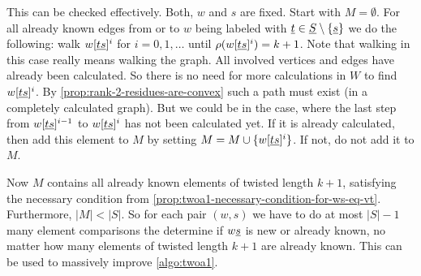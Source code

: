 This can be checked effectively. Both, $w$ and $s$ are fixed. Start with $M = \emptyset$. For all already known edges from or to $w$ being labeled with $\underline{t} \in \underline{S} \setminus \{\underline{s}\}$ we do the following: walk $w[\underline{t} \underline{s}]^i$ for $i = 0,1,\ldots$ until $\rho(w[\underline{t} \underline{s}]^i) = k + 1$. Note that walking in this case really means walking the graph. All involved vertices and edges have already been calculated. So there is no need for more calculations in $W$ to find $w[\underline{t} \underline{s}]^i$. By \ref{prop:rank-2-residues-are-convex} such a path must exist (in a completely calculated graph). But we could be in the case, where the last step from $w[\underline{t} \underline{s}]^{i-1}$ to $w[\underline{t} \underline{s}]^{i}$ has not been calculated yet. If it is already calculated, then add this element to $M$ by setting $M = M \cup \{ w[\underline{t} \underline{s}]^{i} \}$. If not, do not add it to $M$.

Now $M$ contains all already known elements of twisted length $k+1$, satisfying the necessary condition from \ref{prop:twoa1-necessary-condition-for-ws-eq-vt}. Furthermore, $|M| < |S|$. So for each pair $(w,s)$ we have to do at most $|S|-1$ many element comparisons the determine if $w \underline{s}$ is new or already known, no matter how many elements of twisted length $k+1$ are already known. This can be used to massively improve \ref{algo:twoa1}.

